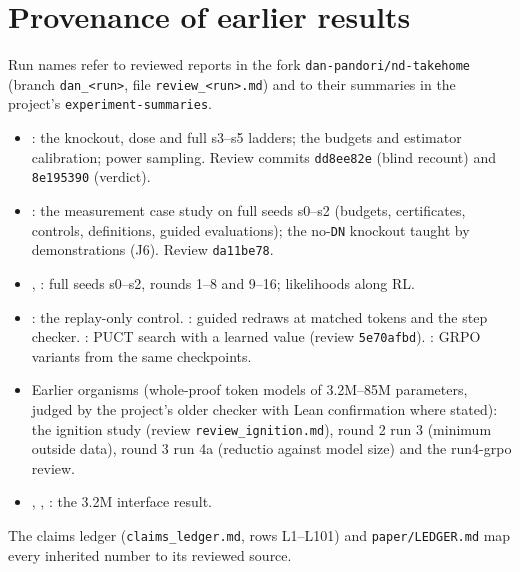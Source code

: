 \section{Provenance of earlier results}
\label{app:provenance}
Run names refer to reviewed reports in the fork \texttt{dan-pandori/nd-takehome} (branch \texttt{dan\_<run>}, file
\texttt{review\_<run>.md}) and to their summaries in the project's \texttt{experiment-summaries}.
\begin{itemize}
\item {}: the knockout, dose and full s3--s5 ladders; the budgets and estimator calibration; power
sampling. Review commits \texttt{dd8ee82e} (blind recount) and \texttt{8e195390} (verdict).
\item {}: the measurement case study on full seeds s0--s2 (budgets, certificates, controls,
definitions, guided evaluations); the no-\texttt{DN} knockout taught by demonstrations (J6). Review \texttt{da11be78}.
\item {}, : full seeds s0--s2, rounds 1--8 and 9--16; likelihoods along RL.
\item {}: the replay-only control. : guided redraws at matched tokens and the step
checker. : PUCT search with a learned value (review \texttt{5e70afbd}). : GRPO variants from
the same checkpoints.
\item Earlier organisms (whole-proof token models of 3.2M--85M parameters, judged by the project's older checker with
Lean confirmation where stated): the ignition study (review \texttt{review\_ignition.md}), round 2 run 3 (minimum
outside data), round 3 run 4a (reductio against model size) and the run4-grpo review.
\item {}, , : the 3.2M interface result.
\end{itemize}
The claims ledger (\texttt{claims\_ledger.md}, rows L1--L101) and \texttt{paper/LEDGER.md} map every inherited number to
its reviewed source.
